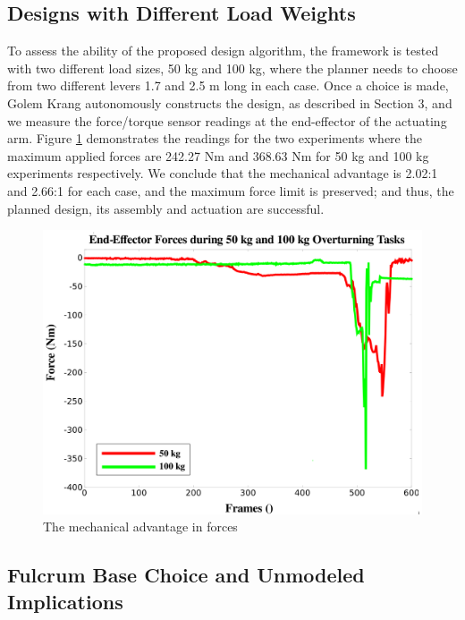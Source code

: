 \documentclass[runningheads,a4paper]{llncs}
\begin{document}
\subsection{Designs with Different Load Weights}

To assess the ability of the proposed design algorithm, the framework is tested with two different
load sizes, 50 kg and 100 kg, where the planner needs to choose from two different levers 1.7 and 2.5
m long in each case. Once a choice is made, Golem Krang autonomously constructs the design, as
described in Section 3, and we measure the force/torque sensor readings at the end-effector of
the actuating arm. Figure \ref{fig:comparison} demonstrates the readings for the two experiments
where the maximum applied forces are 242.27 Nm and 368.63 Nm for 50 kg and 100 kg experiments
respectively. We conclude that the mechanical advantage is 2.02:1 and 2.66:1 for each case, and 
the maximum force limit is preserved; and thus, the planned design, its assembly and actuation are
successful.

\begin{figure}[ht!] 
  \centering
  \includegraphics[width=0.7\linewidth]{Figures/loads.png}
  \caption{The mechanical advantage in forces}
  \label{fig:comparison}
\end{figure}

\subsection{Fulcrum Base Choice and Unmodeled Implications}


\newpage


\end{document}

